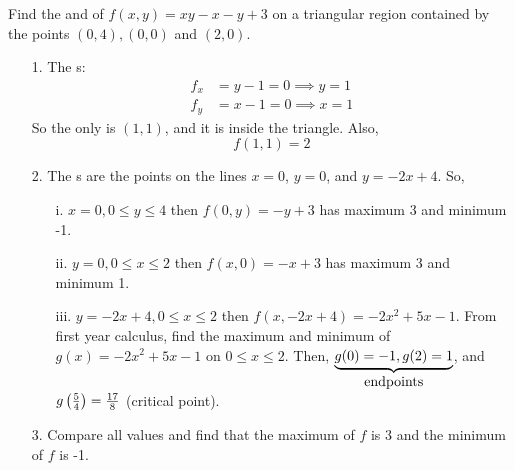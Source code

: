 \documentclass[english, 11pt]{article}
\begin{document}
\begin{exmp}
  Find the  and  of $f(x,y) = xy - x - y + 3$ on a triangular region contained by the points $(0,4), (0,0)$ and $(2,0)$. \\

  \begin{itemize}
    \item[1.] The s:
    \begin{align*}
      f_x & = y - 1 = 0 \implies y = 1 \\
      f_y & = x - 1 = 0 \implies x = 1
    \end{align*}
    So the only  is $(1,1)$, and it is inside the triangle. Also,
    \[ f(1,1) = 2 \]

    \item[2.] The s are the points on the lines $x = 0$, $y = 0$, and $y = -2x + 4$. So,
    \begin{itemize}
      \item[i.] $x = 0, 0 \leq y \leq 4$ then $f(0,y) = -y + 3$ has maximum 3 and minimum -1.
      \item[ii.] $y = 0, 0 \leq x \leq 2$ then $f(x,0) = -x + 3$ has maximum 3 and minimum 1.
      \item[iii.] $y = -2x +4, 0 \leq x \leq 2$ then $f(x,-2x+4) = -2x^2 + 5x -1$. From first year calculus, find the maximum and minimum of $g(x) = -2x^2 + 5x - 1$ on $0 \leq x \leq 2$. Then, $\underbrace{g(0) = -1, g(2) = 1}_{\mbox{endpoints}}$, and $g \left( \frac{5}{4} \right) = \frac{17}{8}$ (critical point).
    \end{itemize}
    \item[3.] Compare all values and find that the maximum of $f$ is 3 and the minimum of $f$ is -1.
  \end{itemize}
\end{exmp}
\end{document}
